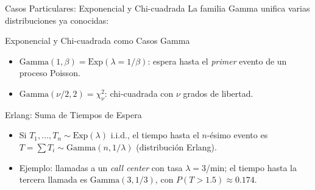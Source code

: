 \documentclass[10pt, aspectratio=169]{beamer}
\begin{document}
\begin{frame}{Casos Particulares: Exponencial y Chi-cuadrada}
  \footnotesize
  La familia Gamma unifica varias distribuciones ya conocidas: \pause

  \vspace{0.1cm}
  \begin{block}{Exponencial y Chi-cuadrada como Casos Gamma}
    \begin{itemize}\itemsep=0.05cm
      \item $\text{Gamma}(1, \beta) = \text{Exp}(\lambda = 1/\beta)$: espera hasta el \emph{primer} evento de un proceso Poisson.
      \item $\text{Gamma}(\nu/2, 2) = \chi^{2}_{\nu}$: chi-cuadrada con $\nu$ grados de libertad.
    \end{itemize}
  \end{block}

  \vspace{0.1cm}
  \pause
  \begin{alertblock}{Erlang: Suma de Tiempos de Espera}
    \begin{itemize}\itemsep=0.05cm
      \item Si $T_{1}, \dots, T_{n} \sim \text{Exp}(\lambda)$ i.i.d., el tiempo hasta el $n$-ésimo evento es $T = \sum T_{i} \sim \text{Gamma}(n, 1/\lambda)$ (distribución Erlang).
      \item Ejemplo: llamadas a un \emph{call center} con tasa $\lambda=3$/min; el tiempo hasta la tercera llamada es $\text{Gamma}(3, 1/3)$, con $P(T>1.5) \approx 0.174$.
    \end{itemize}
  \end{alertblock}
\end{frame}
\end{document}
